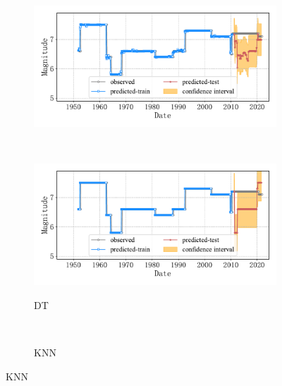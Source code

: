 \begin{figure}[!htbp]
\begin{subfigure}[b]{0.45\textwidth}
    \includegraphics[width=\textwidth]{Img/chap5_seism/split85/seism_gbr_minyear_1932_maxyear_2021_spanlat_2_spanlon_4_timewindow_120_nextmonth_120_minmag_3.0_split_ratio_0.85_blocks1.pdf}
    \vspace{-1cm}
    \label{fig:seism_gbr_minyear_1932_maxyear_2021_spanlat_2_spanlon_4_timewindow_120_nextmonth_120_minmag_3.0_split_ratio_0.85_blocks1}
  \end{subfigure}
  ~
  \begin{subfigure}[b]{0.45\textwidth}
    \caption{DT}
    \vspace{-0.2cm}
    \includegraphics[width=\textwidth]{Img/chap5_seism/split85/seism_dt_minyear_1932_maxyear_2021_spanlat_2_spanlon_4_timewindow_120_nextmonth_120_minmag_3.0_split_ratio_0.85_blocks1.pdf}
    \vspace{-1cm}
    \label{fig:seism_dt_minyear_1932_maxyear_2021_spanlat_2_spanlon_4_timewindow_120_nextmonth_120_minmag_3.0_split_ratio_0.85_blocks1}
  \end{subfigure}
  \\
  \begin{subfigure}[b]{0.45\textwidth}
    \caption{KNN}
    \vspace{-0.2cm}

\end{subfigure}
\end{figure}
